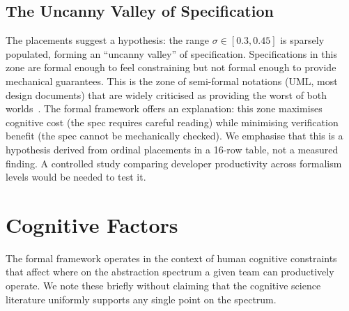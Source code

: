 \documentclass[11pt, a4paper, copyright]{googledeepmind}
\begin{document}
\begin{table}[H]
\caption{Placement of major thinkers on the specificity-compression plane. Values are ordinal estimates based on each thinker's published positions, not computed quantities. $^\dagger$Range reflects the thinker's position that the appropriate level varies by task or context; we estimate the range their work typically occupies. $^\ddagger$These thinkers reject the premise that their position can be mapped onto a fixed $(\sigma, \kappa)$ point (see text). Three clusters emerge: the \emph{formal cluster} ($\hat{\sigma} > 0.7$), the \emph{middle ground} ($0.4 < \hat{\sigma} < 0.7$), and the \emph{NL cluster} ($\hat{\sigma} < 0.3$). Subject to the ordinal reliability of these placements, we hypothesise a gap at $0.3 < \hat{\sigma} < 0.45$, the ``uncanny valley'' of specification.}
\label{tab:thinker-placement}
\end{table}

\subsection{The Uncanny Valley of Specification}

The placements suggest a hypothesis: the range $\sigma \in [0.3, 0.45]$ is sparsely populated, forming an ``uncanny valley'' of specification. Specifications in this zone are formal enough to feel constraining but not formal enough to provide mechanical guarantees. This is the zone of semi-formal notations (UML, most design documents) that are widely criticised as providing the worst of both worlds~\citep{jackson2021essence}. The formal framework offers an explanation: this zone maximises cognitive cost (the spec requires careful reading) while minimising verification benefit (the spec cannot be mechanically checked). We emphasise that this is a hypothesis derived from ordinal placements in a 16-row table, not a measured finding. A controlled study comparing developer productivity across formalism levels would be needed to test it.


\section{Cognitive Factors}
\label{sec:cognitive}

The formal framework operates in the context of human cognitive constraints that affect where on the abstraction spectrum a given team can productively operate. We note these briefly without claiming that the cognitive science literature uniformly supports any single point on the spectrum.
\end{document}
